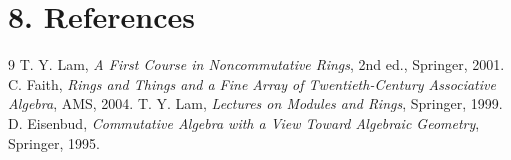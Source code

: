 \section*{8. References}
\begin{thebibliography}{9}
 T. Y. Lam, \emph{A First Course in Noncommutative Rings}, 2nd ed., Springer, 2001.
 C. Faith, \emph{Rings and Things and a Fine Array of Twentieth-Century Associative Algebra}, AMS, 2004.
 T. Y. Lam, \emph{Lectures on Modules and Rings}, Springer, 1999.
 D. Eisenbud, \emph{Commutative Algebra with a View Toward Algebraic Geometry}, Springer, 1995.
\end{thebibliography}
